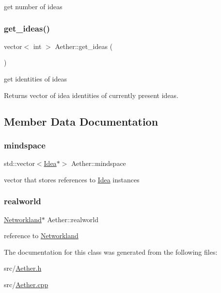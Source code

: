 get number of ideas 

\mbox{\label{classAether_a9ca2639bc95e00c78849775f578ea088}} 
\subsubsection{\texorpdfstring{get\+\_\+ideas()}{get\_ideas()}}
{\footnotesize\ttfamily vector$<$ int $>$ Aether\+::get\+\_\+ideas (\begin{DoxyParamCaption}{ }\end{DoxyParamCaption})}



get identities of ideas 

Returns vector of idea identities of currently present ideas. 

\subsection{Member Data Documentation}
\mbox{\label{classAether_ac58cc20fc4eddd732cfe22b2557060b1}} 
\subsubsection{\texorpdfstring{mindspace}{mindspace}}
{\footnotesize\ttfamily std\+::vector$<$\hyperlink{classIdea}{Idea}$\ast$$>$ Aether\+::mindspace\hspace{0.3cm}{\ttfamily [private]}}



vector that stores references to \hyperlink{classIdea}{Idea} instances 

\mbox{\label{classAether_ad7e88c3d473a78ba840eab68adc06d04}} 
\subsubsection{\texorpdfstring{realworld}{realworld}}
{\footnotesize\ttfamily \hyperlink{classNetworkland}{Networkland}$\ast$ Aether\+::realworld\hspace{0.3cm}{\ttfamily [private]}}



reference to \hyperlink{classNetworkland}{Networkland} 



The documentation for this class was generated from the following files\+:\begin{DoxyCompactItemize}
\item 
src/\hyperlink{Aether_8h}{Aether.\+h}\item 
src/\hyperlink{Aether_8cpp}{Aether.\+cpp}\end{DoxyCompactItemize}
